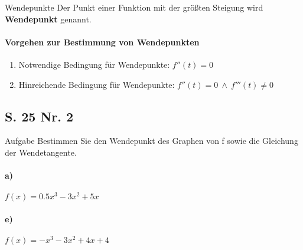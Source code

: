 \documentclass[arbeitsmappe.tex]{subfiles}
\begin{document}
    \begin{gblock}{Wendepunkte}
        Der Punkt einer Funktion mit der größten Steigung wird \textbf{Wendepunkt} genannt.

        \paragraph{Vorgehen zur Bestimmung von Wendepunkten}
        \begin{enumerate}
            \item Notwendige Bedingung für Wendepunkte: $f''(t) = 0$
            \item Hinreichende Bedingung für Wendepunkte: $f''(t) = 0\ \land\ f'''(t) \ne 0$
        \end{enumerate}
    \end{gblock}

    \subsection{S. 25 Nr. 2}
    \begin{rblock}{Aufgabe}
        Bestimmen Sie den Wendepunkt des Graphen von f sowie die Gleichung der Wendetangente.

        \paragraph{a)} $f(x) = 0.5x^3 - 3x^2 + 5x$

        \paragraph{e)} $f(x) = -x^3 - 3x^2 + 4x + 4$
    \end{rblock}
\end{document}

